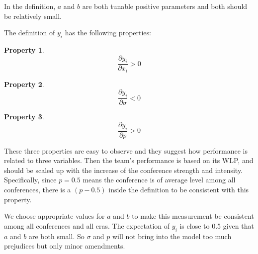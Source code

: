 In the definition, $a$ and $b$ are both tunable positive parameters and both should be relatively small. %

The definition of $y_i$ has the following properties:

\newtheorem{property}{Property}

\begin{property}
$$\frac{\partial{y_i}}{\partial{x_i}} > 0$$
\end{property}

\begin{property}
$$\frac{\partial{y_i}}{\partial{\sigma}}<0$$
\end{property}

\begin{property}
$$\frac{\partial{y_i}}{\partial{p}} > 0$$
\end{property}

These three properties are easy to observe and they suggest how performance is related to three variables. Then the team's performance is based on its WLP, and should be scaled up with the increase of the conference strength and intensity. Specifically, since $p=0.5$ means the conference is of average level among all conferences, there is a $(p-0.5)$ inside the definition to be consistent with this property.


We choose appropriate values for $a$ and $b$ to make this measurement be consistent among all conferences and all eras. The expectation of $y_i$ is close to 0.5 given that $a$ and $b$ are both small. So $\sigma$ and $p$ will not bring into the model too much prejudices but only minor amendments.


